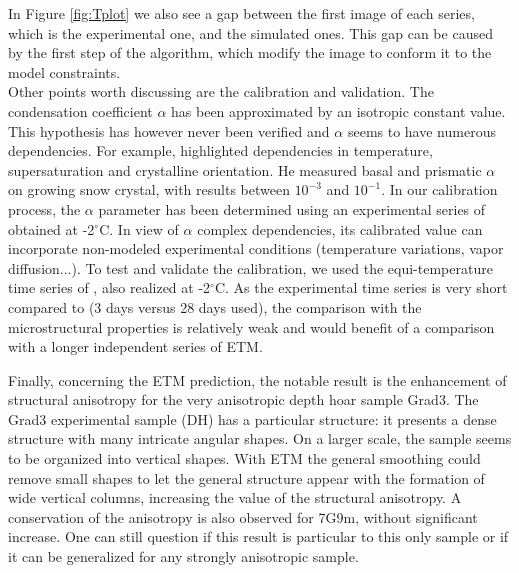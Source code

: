 \documentclass[draft,ms]{agujournal2019}
\begin{document}
In Figure \ref{fig:Tplot} we also see a gap between the first image of each series, which is the experimental one, and the simulated ones. This gap can be caused by the first step of the algorithm, which modify the image to conform it to the model constraints.\\
Other points worth discussing are the calibration and validation. The condensation coefficient $\alpha$ has been approximated by an isotropic constant value. This hypothesis has however never been verified and $\alpha$ seems to have numerous dependencies. For example,  highlighted dependencies in temperature, supersaturation and crystalline orientation. He measured basal and prismatic $\alpha$ on growing snow crystal, with results between $10^{-3}$ and $10^{-1}$.
In our calibration process, the $\alpha$ parameter has been determined using an experimental series of  obtained at -2$^\circ$C. In view of $\alpha$ complex dependencies, its calibrated value can incorporate non-modeled experimental conditions (temperature variations, vapor diffusion...).
To test and validate the calibration, we used the equi-temperature time series of , also realized at -2$^\circ$C. %
As the experimental time series is very short compared to  (3 days versus 28 days used), the comparison with the microstructural properties is relatively weak and would benefit of a comparison with a longer independent series of ETM. %

Finally, concerning the ETM prediction, the notable result is the enhancement of structural anisotropy for the very anisotropic depth hoar sample Grad3. The Grad3 experimental sample (DH) has a particular structure: it presents a dense structure with many intricate angular shapes. On a larger scale, the sample seems to be organized into vertical shapes. With ETM the general smoothing could remove small shapes to let the general structure appear with the formation of wide vertical columns, increasing the value of the structural anisotropy. A conservation of the anisotropy is also observed for 7G9m, without significant increase. One can still question if this result is particular to this only sample or if it can be generalized for any strongly anisotropic sample. 
\end{document}
